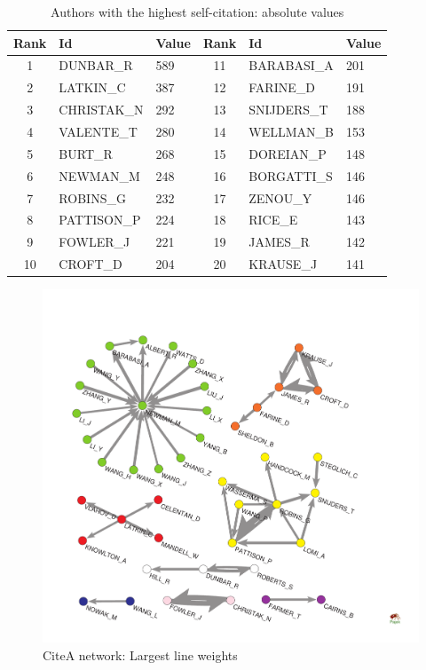 \documentclass[11pt]{article} %
\begin{document}
\begin{table}
\caption{Authors with the highest self-citation: absolute values} \label{citealoops}\medskip
\renewcommand{\arraystretch}{0.95}
\small
\begin{center}
\begin{tabular}{c|l|l|c|l|l|} 
     Rank  &    Id  & 	Value	 &    Rank  &     Id  &	  Value \\  \hline  
        1  &  DUNBAR\_R	&    		589  & 11   & BARABASI\_A	&  201    \\
        2  &  LATKIN\_C	&    		387  & 12   & FARINE\_D	   	&  191    \\
        3  &  CHRISTAK\_N	&    	292  & 13   & SNIJDERS\_T	&  188    \\
        4  &  VALENTE\_T	&    	280  & 	14   & WELLMAN\_B	 &  153   \\
        5  &  BURT\_R	      	&    	268  & 15   & DOREIAN\_P	&  148    \\
        6  &  NEWMAN\_M	&    		248  & 16   & BORGATTI\_S	&  146    \\
        7  &  ROBINS\_G	&    		232  & 17   & ZENOU\_Y	   	&  146    \\    
        8  &  PATTISON\_P	&    	224  & 18   & RICE\_E	   	&  143    \\    
        9  &  FOWLER\_J	&    		221  & 19   & JAMES\_R	   	&  142     \\    
       10  &  CROFT\_D	      	&   	204  & 20    & KRAUSE\_J	 & 141     \\ \hline 
\end{tabular} 
\end{center}
\end{table}  

\begin{figure}
\begin{center}
\includegraphics[width=\textwidth]{CiteA_43.pdf}
\end{center}
\caption{CiteA network: Largest line weights} \label{citealw}
\end{figure}
\end{document}
